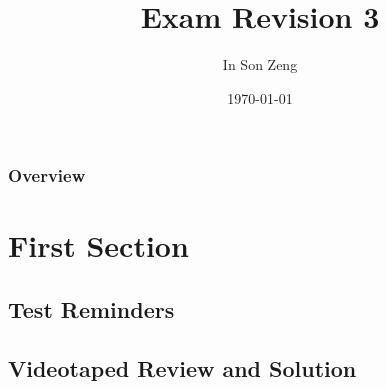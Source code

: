 \documentclass{beamer}
\title[Midterm Revision]{Exam Revision 3} %
\author{In Son Zeng} %
\institute[University of Michigan] %
{
University of Michigan \\ %
\medskip
\textit{insonz@umich.edu} %
}
\date{\today} %
\begin{document}
\begin{frame}
\titlepage %
\end{frame}

\begin{frame}
\frametitle{Overview} %
\tableofcontents %
\end{frame}


\section{First Section} %
\subsection{Test Reminders}
\subsection{Videotaped Review and Solution}

\end{document}
